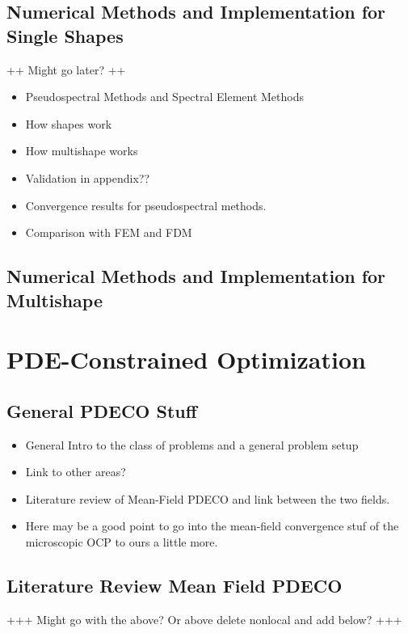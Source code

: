 \documentclass[11pt, a4paper]{article}
\theoremstyle{definition}
\begin{document}
	\subsection{Numerical Methods and Implementation for Single Shapes}	
		++ Might go later? ++
	\begin{itemize}
		\item Pseudospectral Methods and Spectral Element Methods
		\item How shapes work
		\item How multishape works
		\item Validation in appendix??
		\item Convergence results for pseudospectral methods.
		\item Comparison with FEM and FDM
	\end{itemize}
	

	\subsection{Numerical Methods and Implementation for Multishape}
		
    
    
    
    
    
    
	\section{PDE-Constrained Optimization}
	
	\subsection{General PDECO Stuff}
		\begin{itemize}
			\item General Intro to the class of problems and a general problem setup
			\item Link to other areas?
			\item Literature review of Mean-Field PDECO and link between the two fields.
			\item Here may be a good point to go into the mean-field convergence stuf of the microscopic OCP to ours a little more.
		\end{itemize}
	
	
	\subsection{Literature Review Mean Field PDECO}
	+++ Might go with the above? Or above delete nonlocal and add below? +++
	
	
\end{document}
